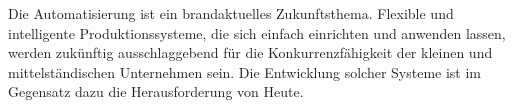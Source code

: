 Die Automatisierung ist ein brandaktuelles Zukunftsthema. Flexible und intelligente Produktionssysteme, die sich einfach einrichten und anwenden lassen, werden zukünftig ausschlaggebend für die Konkurrenzfähigkeit der kleinen und mittelständischen Unternehmen sein. Die Entwicklung solcher Systeme ist im Gegensatz dazu die Herausforderung von Heute.
